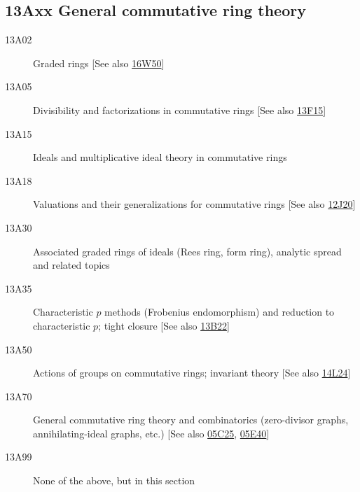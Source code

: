 \subsection*{13Axx General commutative ring theory }\label{13Axx}
\begin{description}               
\item [13A02]\label{13A02} Graded rings [See also \hyperref[16W50]{16W50}]
\item [13A05]\label{13A05} Divisibility and factorizations in commutative rings [See also \hyperref[13F15]{13F15}]
\item [13A15]\label{13A15} Ideals and multiplicative ideal theory in commutative rings
\item [13A18]\label{13A18} Valuations and their generalizations for commutative rings [See also \hyperref[12J20]{12J20}]
\item [13A30]\label{13A30} Associated graded rings of ideals (Rees ring, form ring), analytic spread and related topics
\item [13A35]\label{13A35} Characteristic $p$ methods (Frobenius endomorphism) and reduction to characteristic $p$; tight closure [See also \hyperref[13B22]{13B22}]
\item [13A50]\label{13A50} Actions of groups on commutative rings; invariant theory [See also \hyperref[14L24]{14L24}]
\item [13A70]\label{13A70} General commutative ring theory and combinatorics (zero-divisor graphs, annihilating-ideal graphs, etc.) [See also \hyperref[05C25]{05C25}, \hyperref[05E40]{05E40}]
\item [13A99]\label{13A99} None of the above, but in this section
\end{description}          
